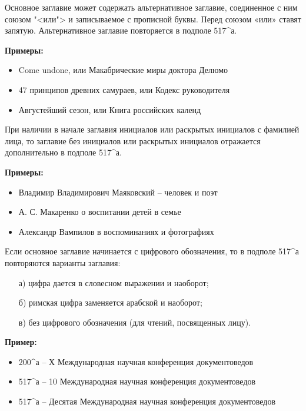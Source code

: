 Основное заглавие может содержать альтернативное заглавие, соединенное с ним союзом "<или"> и записываемое с прописной буквы. Перед союзом «или» ставят запятую. Альтернативное заглавие повторяется в подполе 517\^{}а.

\textbf{Примеры:}

\vspace{-3mm}
\begin{itemize}
    \setlength\itemsep{-2mm}
	\item Come undone, или Макабрические миры доктора Делюмо
	\item 47 принципов древних самураев, или Кодекс руководителя
	\item Августейший сезон, или Книга российских календ
\end{itemize}

При наличии в начале заглавия инициалов или раскрытых инициалов с фамилией лица, то заглавие без инициалов или раскрытых инициалов отражается дополнительно в подполе 517\^{}а.

\textbf{Примеры:}

\vspace{-3mm}
\begin{itemize}
    \setlength\itemsep{-2mm}
	\item Владимир Владимирович Маяковский -- человек и поэт
	\item А. С. Макаренко о воспитании детей в семье
	\item Александр Вампилов в воспоминаниях и фотографиях
\end{itemize}

Если основное заглавие начинается с цифрового обозначения, то в подполе 517\^{}а повторяются варианты заглавия:

\vspace{-3mm}
\begin{itemize}
    \setlength\itemsep{-2mm}
	\item[а)] цифра дается в словесном выражении и наоборот;
	\item[б)] римская цифра заменяется арабской и наоборот;
	\item[в)] без цифрового обозначения (для чтений, посвященных лицу).
\end{itemize}

\textbf{Пример:}

\vspace{-3mm}
\begin{itemize}
    \setlength\itemsep{-2mm}
	\item 200\^{}а – Х Международная научная конференция документоведов
	\item 517\^{}а – 10 Международная научная конференция документоведов
	\item 517\^{}а – Десятая Международная научная конференция документоведов
\end{itemize}

